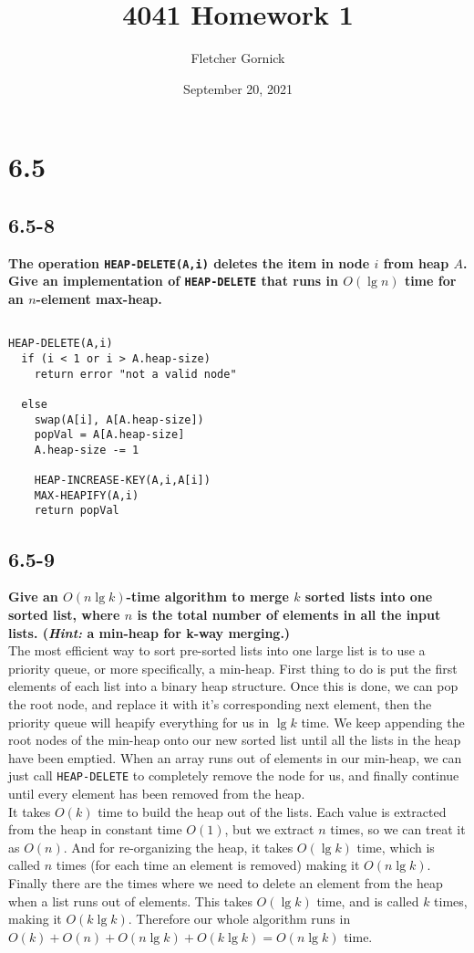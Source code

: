 \documentclass[11pt]{article}
\title{4041 Homework 1}
\author{Fletcher Gornick}
\date{September 20, 2021}
\begin{document}
 \maketitle 
 \section*{6.5}

 \subsection*{6.5-8}
 \textbf{The operation \texttt{HEAP-DELETE(A,i)} deletes the item in node $i$ from heap $A$. 
 Give an implementation of \texttt{HEAP-DELETE} that runs in $O(\lg n)$ time for an $n$-element 
 max-heap.}
 \begin{verbatim}

HEAP-DELETE(A,i)
  if (i < 1 or i > A.heap-size)
    return error "not a valid node"

  else
    swap(A[i], A[A.heap-size])
    popVal = A[A.heap-size]
    A.heap-size -= 1

    HEAP-INCREASE-KEY(A,i,A[i])
    MAX-HEAPIFY(A,i)
    return popVal
 \end{verbatim}
\newpage

 \subsection*{6.5-9}
 \textbf{Give an $O(n \lg k)$-time algorithm to merge $k$ sorted lists into one sorted list, 
 where $n$ is the total number of elements in all the input lists. (\textit{Hint:} a min-heap 
 for k-way merging.)} \\

 The most efficient way to sort pre-sorted lists into one large list is to use a priority queue, 
 or more specifically, a min-heap.  First thing to do is put the first elements of each list into 
 a binary heap structure.  Once this is done, we can pop the root node, and replace it with it's 
 corresponding next element, then the priority queue will heapify everything for us in $\lg k$ 
 time.  We keep appending the root nodes of the min-heap onto our new sorted list until all the 
 lists in the heap have been emptied.  When an array runs out of elements in our min-heap, we can 
 just call \texttt{HEAP-DELETE} to completely remove the node for us, and finally continue until 
 every element has been removed from the heap. \\

 It takes $O(k)$ time to build the heap out of the lists.  Each value is extracted from the heap 
 in constant time $O(1)$, but we extract $n$ times, so we can treat it as $O(n)$.  And for 
 re-organizing the heap, it takes $O(\lg k)$ time, which is called $n$ times (for each time an
 element is removed) making it $O(n \lg k)$.  Finally there are the times where we need to delete 
 an element from the heap when a list runs out of elements.  This takes $O(\lg k)$ time, and is 
 called $k$ times, making it $O(k \lg k)$.  Therefore our whole algorithm runs in 
 $O(k) + O(n) + O(n \lg k) + O(k \lg k) = O(n \lg k)$ time. \\
\end{document}

